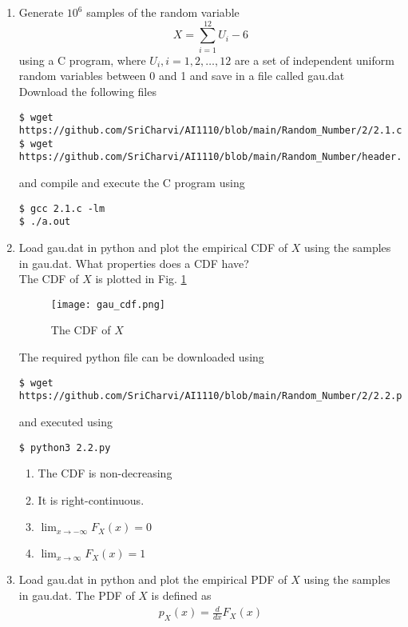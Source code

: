 \documentclass[journal,12pt,twocolumn]{IEEEtran}
\renewcommand\thesection{\arabic{section}}
\begin{document}
\begin{enumerate}[label=\thesection.\arabic*
,ref=\thesection.\theenumi]
%
\item
Generate $10^6$ samples of the random variable
%
\begin{equation}
X = \sum_{i=1}^{12}U_i -6
\end{equation}
%
using a C program, where $U_i, i = 1,2,\dots, 12$ are  a set of independent uniform random variables between 0 and 1
and save in a file called gau.dat\\
\solution Download the following files
\begin{lstlisting}
$ wget https://github.com/SriCharvi/AI1110/blob/main/Random_Number/2/2.1.c
$ wget https://github.com/SriCharvi/AI1110/blob/main/Random_Number/header.h
\end{lstlisting}
and compile and execute the C program using
\begin{lstlisting}
$ gcc 2.1.c -lm
$ ./a.out
\end{lstlisting}
%
\item
Load gau.dat in python and plot the empirical CDF of $X$ using the samples in gau.dat. What properties does a CDF have?\\
\solution The CDF of $X$ is plotted in Fig. \ref{fig:gauss_cdf}
\begin{figure}
\centering
\texttt{[image: gau\_cdf.png]}
\caption{The CDF of $X$}
\label{fig:gauss_cdf}
\end{figure}
The required python file can be downloaded using
\begin{lstlisting}
$ wget https://github.com/SriCharvi/AI1110/blob/main/Random_Number/2/2.2.py
\end{lstlisting}
and executed using
\begin{lstlisting}
$ python3 2.2.py
\end{lstlisting}
		\begin{enumerate}
			\item The CDF is non-decreasing
			\item It is right-continuous.
			\item $\lim_{x \to -\infty}F_X(x) = 0$
			\item $\lim_{x \to \infty}F_X(x) = 1$
		\end{enumerate}
\item
Load gau.dat in python and plot the empirical PDF of $X$ using the samples in gau.dat. The PDF of $X$ is defined as
\begin{align}
p_{X}(x) = \frac{d}{dx}F_{X}(x)
\end{align}

\end{enumerate}
\end{document}
